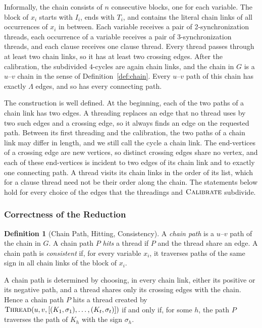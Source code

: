 \documentclass[a4paper,fleqn]{cas-sc}
\numberwithin{equation}{section}
\theoremstyle{definition}
\newtheorem{definition}{Definition}[section]
\theoremstyle{plain}
\theoremstyle{remark}
\begin{document}
Informally, the chain consists of $n$ consecutive blocks, one for each variable.
The block of $x_i$ starts with $I_i$, ends with $T_i$, and contains the literal chain links of all occurrences of $x_i$ in between.
Each variable receives a pair of 2-synchronization threads, each occurrence of a variable receives a pair of 3-synchronization threads, and each clause receives one clause thread.
Every thread passes through at least two chain links, so it has at least two crossing edges.
After the calibration, the subdivided $4$-cycles are again chain links, and the chain in $G$ is a $u$--$v$ chain in the sense of Definition~\ref{def:chain}.
Every $u$--$v$ path of this chain has exactly $\Lambda$ edges, and so has every connecting path.

The construction is well defined.
At the beginning, each of the two paths of a chain link has two edges.
A threading replaces an edge that no thread uses by two such edges and a crossing edge, so it always finds an edge on the requested path.
Between its first threading and the calibration, the two paths of a chain link may differ in length, and we still call the cycle a chain link.
The end-vertices of a crossing edge are new vertices, so distinct crossing edges share no vertex, and each of these end-vertices is incident to two edges of its chain link and to exactly one connecting path.
A thread visits its chain links in the order of its list, which for a clause thread need not be their order along the chain.
The statements below hold for every choice of the edges that the threadings and $\textsc{Calibrate}$ subdivide.

\subsubsection{Correctness of the Reduction}
\label{sec:reduction-correctness}
\begin{definition}[Chain Path, Hitting, Consistency]
\label{def:chain-path}
A \emph{chain path} is a $u$--$v$ path of the chain in $G$.
A chain path $P$ \emph{hits} a thread if $P$ and the thread share an edge.
A chain path is \emph{consistent} if, for every variable $x_i$, it traverses paths of the same sign in all chain links of the block of $x_i$.
\end{definition}

A chain path is determined by choosing, in every chain link, either its positive or its negative path, and a thread shares only its crossing edges with the chain.
Hence a chain path $P$ hits a thread created by $\textsc{Thread}(u,v,\allowbreak[(K_1,\sigma_1),\dots,(K_t,\sigma_t)])$ if and only if, for some $h$, the path $P$ traverses the path of $K_h$ with the sign $\sigma_h$.
\end{document}
